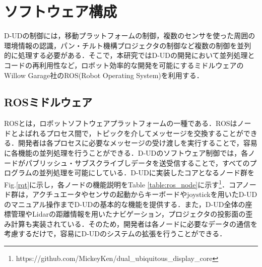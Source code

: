 \documentclass[12pt]{sonota/aislab}
\begin{document}


\section{ソフトウェア構成}
D-UDの制御には，移動プラットフォームの制御，複数のセンサを使った周囲の環境情報の認識，パン・チルト機構プロジェクタの制御など複数の制御を並列的に処理する必要がある．そこで，本研究ではD-UDの開発において並列処理とコードの再利用性など，ロボット効率的な開発を可能にするミドルウェアのWillow Garage社のROS(Robot Operating System)\cite{ROS}を利用する．

\subsection{ROSミドルウェア}
ROSとは，ロボットソフトウェアプラットフォームの一種である．ROSはノードとよばれるプロセス間で，トピックを介してメッセージを交換することができる．開発者は各プロセスに必要なメッセージの受け渡しを実行することで，容易に各機能の並列処理を行うことができる．D-UDのソフトウェア制御では，各ノードがパブリッシュ・サブスクライブしデータを送受信することで，すべてのプログラムの並列処理を可能にしている．D-UDに実装したコアとなるノード群をFig.\ref{rqt}に示し，各ノードの機能説明をTable \ref{table:ros_node}に示す\footnote{https://github.com/MickeyKen/dual\_ubiquitous\_display\_core}．コアノード群は，アクチュエータやセンサの起動からキーボードやjoystickを用いたD-UDのマニュアル操作までD-UDの基本的な機能を提供する．また，D-UD全体の座標管理やLidarの距離情報を用いたナビゲーション，プロジェクタの投影面の歪み計算も実装されている．そのため，開発者は各ノードに必要なデータの通信を考慮するだけで，容易にD-UDのシステムの拡張を行うことができる．
\end{document}
